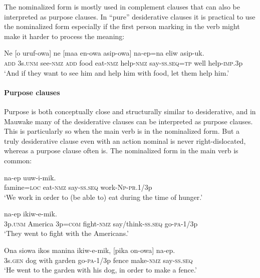 The nominalized form is mostly used in complement clauses that can also be interpreted as purpose clauses. In ``pure'' desiderative clauses it is practical to use the nominalized form especially if the first person marking in the verb might make it harder to process the meaning:

\ea%
\label{ex:8:x1610}
\gll Ne  [o  uruf-owa]  ne  [maa  en-owa  asip-owa] na-ep=na  eliw  asip-uk.\\
\textsc{add} 3s.\textsc{unm} see-\textsc{nmz} \textsc{add} food  eat-\textsc{nmz} help-\textsc{nmz} say-\textsc{ss}.\textsc{seq}=\textsc{tp} well help-\textsc{imp}.3p\\
\glt`And if they want to see him and help him with food, let them help him.'
\z


\paragraph[Purpose clauses]{Purpose clauses} \label{sec:8.3.2.1.4}

Purpose is both conceptually close and structurally similar to desiderative, and in Mauwake many of the desiderative clauses can be interpreted as purpose clauses. This is particularly so when the main verb is in the nominalized form. But a truly desiderative clause even with an action nominal is never right-dislocated, whereas a purpose clause  often is. The nominalized form in the main verb is common:

\ea%
\label{ex:8:x371}
\gll [Weniwa=pa  en-owa]  na-ep  uuw-i-mik. \\
famine=\textsc{loc} eat-\textsc{nmz} say-\textsc{ss}.\textsc{seq} work-\textsc{Np}-\textsc{pr}.1/3p\\
\glt`We work in order to (be able to) eat during the time of hunger.'
\z


\ea%
\label{ex:8:x345}
\gll [Wi  Amerika  wiam=iya  irak-owa]  na-ep  ikiw-e-mik.\\
3p.\textsc{unm} America  3p=\textsc{com} fight-\textsc{nmz} say/think-\textsc{ss}.\textsc{seq} go-\textsc{pa}-1/3p\\
\glt`They went to fight with the Americans.'
\z


\ea%
\label{ex:8:x372}
\gll Ona  siowa  ikos  manina  ikiw-e-mik, [pika  on-owa] na-ep.\\
3s.\textsc{gen} dog  with  garden  go-\textsc{pa}-1/3p  fence  make-\textsc{nmz} say-\textsc{ss}.\textsc{seq}\\
\glt`He went to the garden with his dog, in order to make a fence.'
\z


